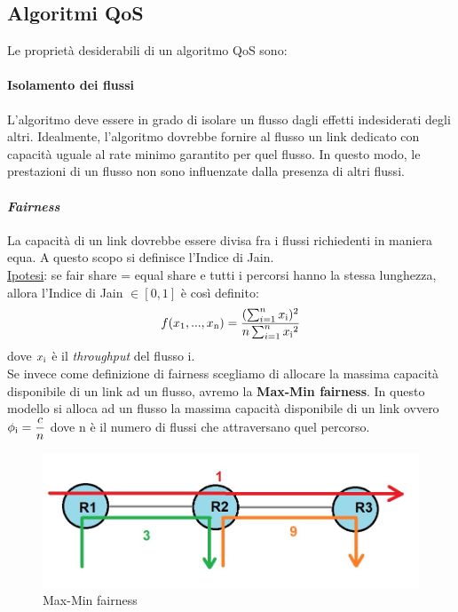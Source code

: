 \documentclass{article}
\begin{document}
\subsection{Algoritmi QoS}
Le proprietà desiderabili di un algoritmo QoS sono:
\paragraph{Isolamento dei flussi} L'algoritmo deve essere in grado di isolare un flusso dagli effetti indesiderati degli altri. Idealmente, l'algoritmo dovrebbe fornire al flusso un link dedicato con capacità uguale al rate minimo garantito per quel flusso. In questo modo, le prestazioni di un flusso non sono influenzate dalla presenza di altri flussi.\\
\paragraph{\textit{Fairness}} La capacità di un link dovrebbe essere divisa fra i flussi richiedenti in maniera equa. A questo scopo si definisce l'Indice di Jain.\\
\underline{Ipotesi}: se fair share = equal share e tutti i percorsi hanno la stessa lunghezza, allora l'Indice di Jain \( \in [0, 1]\) è così definito:\\
\[ f(x\textsubscript{1},...,x\textsubscript{n}) = \frac{(\sum_{i=1}^n x\textsubscript{i})\textsuperscript{2}}{n\sum_{i=1}^n x\textsubscript{i}\textsuperscript{2}}
\]
dove \(\displaystyle x\textsubscript{i} \) è il \textit{throughput} del flusso i.\\
Se invece come definizione di fairness scegliamo di allocare la massima capacità disponibile di un link ad un flusso, avremo la \textbf{Max-Min fairness}. In questo modello si alloca ad un flusso la massima capacità disponibile di un link ovvero \( \displaystyle \phi\textsubscript{i} = \frac{c}{n} \) dove n è il numero di flussi che attraversano quel percorso.
\begin{figure}[H]
    \centering
    \includegraphics[scale=0.4]{figures/maxmin.jpg}
    \caption{Max-Min fairness}
\end{figure}
\end{document}
